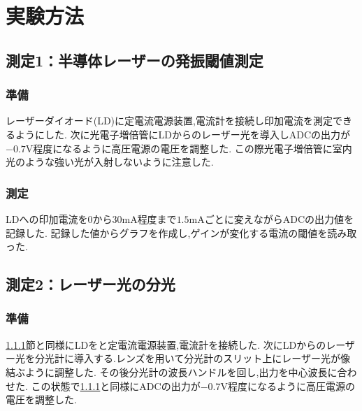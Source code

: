 \section{実験方法}
\subsection{測定1：半導体レーザーの発振閾値測定}
\subsubsection{準備}
\label{subsubsec:sokute1}
レーザーダイオード(LD)に定電流電源装置,電流計を接続し印加電流を測定できるようにした.
次に光電子増倍管にLDからのレーザー光を導入しADCの出力が$-0.7\si{\volt}$程度になるように高圧電源の電圧を調整した.
この際光電子増倍管に室内光のような強い光が入射しないように注意した.
\subsubsection{測定}
LDへの印加電流を$0$から$30\si{\milli\ampere}$程度まで$1.5\si{\milli\ampere}$ごとに変えながらADCの出力値を記録した.
記録した値からグラフを作成し,ゲインが変化する電流の閾値を読み取った.
\subsection{測定2：レーザー光の分光}
\subsubsection{準備}
\ref{subsubsec:sokute1}節と同様にLDをと定電流電源装置,電流計を接続した.
次にLDからのレーザー光を分光計に導入する.レンズを用いて分光計のスリット上にレーザー光が像結ぶように調整した.
その後分光計の波長ハンドルを回し,出力を中心波長に合わせた.
この状態で\ref{subsubsec:sokute1}と同様にADCの出力が$-0.7\si{\volt}$程度になるように高圧電源の電圧を調整した.
